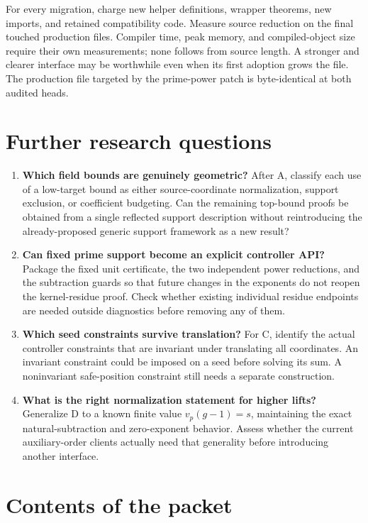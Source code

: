 \documentclass[11pt]{article}
\begin{document}
For every migration, charge new helper definitions, wrapper theorems,
new imports, and retained compatibility code. Measure source reduction
on the final touched production files. Compiler time, peak memory, and
compiled-object size require their own measurements; none follows from
source length. A stronger and clearer interface may be worthwhile even
when its first adoption grows the file. The production file targeted by
the prime-power patch is byte-identical at both audited heads.

\section{Further research questions}

\begin{enumerate}
\item \textbf{Which field bounds are genuinely geometric?} After A,
classify each use of a low-target bound as either source-coordinate
normalization, support exclusion, or coefficient budgeting. Can the
remaining top-bound proofs be obtained from a single reflected support
description without reintroducing the already-proposed generic support
framework as a new result?
\item \textbf{Can fixed prime support become an explicit controller API?}
Package the fixed unit certificate, the two independent power reductions,
and the subtraction guards so that future changes in the exponents do not
reopen the kernel-residue proof. Check whether existing individual residue
endpoints are needed outside diagnostics before removing any of them.
\item \textbf{Which seed constraints survive translation?} For C, identify
the actual controller constraints that are invariant under translating all
coordinates. An invariant constraint could be imposed on a seed before
solving its sum. A noninvariant safe-position constraint still needs a
separate construction.
\item \textbf{What is the right normalization statement for higher lifts?}
Generalize D to a known finite value \(v_p(g-1)=s\), maintaining the exact
natural-subtraction and zero-exponent behavior. Assess whether the current
auxiliary-order clients actually need that generality before introducing
another interface.
\end{enumerate}

\section*{Contents of the packet}
\end{document}
